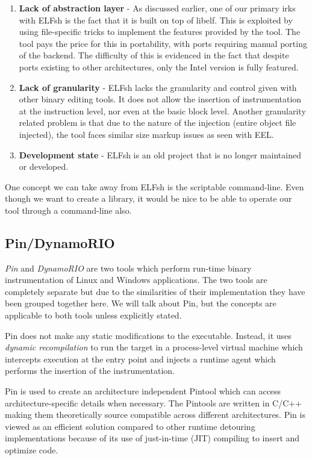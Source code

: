 \begin{enumerate}
 \item \textbf{Lack of abstraction layer} - As discussed earlier, one of our primary irks with ELFsh is the fact that it is built on top of libelf. This is exploited by using file-specific tricks to implement the features provided by the tool. The tool pays the price for this in portability, with ports requiring manual porting of the backend. The difficulty of this is evidenced in the fact that despite ports existing to other architectures, only the Intel version is fully featured.
 \item \textbf{Lack of granularity} - ELFsh lacks the granularity and control given with other binary editing tools. It does not allow the insertion of instrumentation at the instruction level, nor even at the basic block level. Another granularity related problem is that due to the nature of the injection (entire object file injected), the tool faces similar size markup issues as seen with EEL.
 \item \textbf{Development state} - ELFsh is an old project that is no longer maintained or developed.
\end{enumerate}

One concept we can take away from ELFsh is the scriptable command-line. Even though we want to create a library, it would be nice to be able to operate our tool through a command-line also.

\subsection{Pin/DynamoRIO}

\emph{Pin} and \emph{DynamoRIO} are two tools which perform run-time binary instrumentation of Linux and Windows applications\cite{pin,pin_windows,dynamorio}. The two tools are completely separate but due to the similarities of their implementation they have been grouped together here. We will talk about Pin, but the concepts are applicable to both tools unless explicitly stated.

Pin does not make any static modifications to the executable. Instead, it uses \emph{dynamic recompilation} to run the target in a process-level virtual machine which intercepts execution at the entry point and injects a runtime agent which performs the insertion of the instrumentation. 

Pin is used to create an architecture independent Pintool which can access architecture-specific details when necessary. The Pintools are written in C/C++ making them theoretically source compatible across different architectures. Pin is viewed as an efficient solution compared to other runtime detouring implementations because of its use of just-in-time (JIT) compiling to insert and optimize code.

